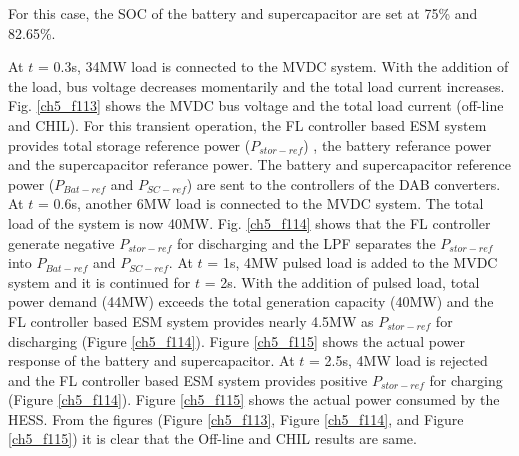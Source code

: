 For this case, the SOC of the battery and supercapacitor are set at 75\% and 82.65\%. 


At $t$ = 0.3s, 34MW load is connected to the MVDC system. With the addition of the load, bus voltage decreases momentarily and  the total load current increases. Fig. \ref{ch5_f113} shows the MVDC bus voltage and the total load current (off-line and CHIL). For this transient operation, the FL controller based ESM system provides total storage reference power ($P_{stor-ref}$) , the battery referance power and the supercapacitor referance power. The battery and supercapacitor reference power ($P_{Bat-ref}$ and $P_{SC-ref}$) are sent to the controllers of the DAB converters. At $t$ = 0.6s, another 6MW load is connected to the MVDC system. The total load of the system is now 40MW. Fig. \ref{ch5_f114} shows that the FL controller generate negative $P_{stor-ref}$ for discharging and the LPF separates the $P_{stor-ref}$  into $P_{Bat-ref}$  and $P_{SC-ref}$. At $t$ = 1s, 4MW pulsed load is added to the MVDC system and it is continued for $t$ = 2s. With the addition of pulsed load, total power demand (44MW) exceeds the total generation capacity (40MW) and the FL controller based ESM system provides nearly 4.5MW as $P_{stor-ref}$ for discharging (Figure \ref{ch5_f114}). Figure \ref{ch5_f115} shows the actual power response of the battery and supercapacitor. At $t$ = 2.5s, 4MW load is rejected and the FL controller based ESM system provides  positive $P_{stor-ref}$ for charging (Figure \ref{ch5_f114}).  Figure \ref{ch5_f115} shows the actual power consumed by the HESS. From the figures (Figure \ref{ch5_f113}, Figure \ref{ch5_f114}, and Figure \ref{ch5_f115}) it is clear that the Off-line and CHIL results are same. 


